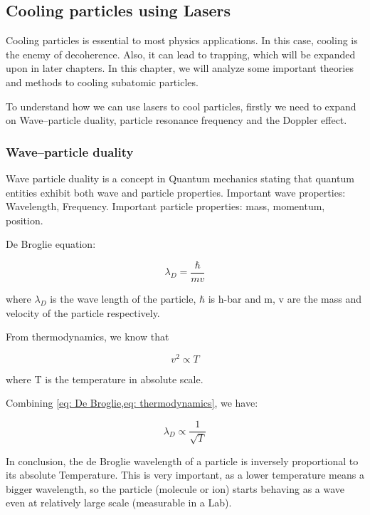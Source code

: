 \documentclass[../main.tex]{subfiles}
\begin{document}
\subsection{Cooling particles using Lasers}

\tab Cooling particles is essential to most physics applications. In this case, cooling is the enemy of decoherence. Also, it can lead to trapping, which will be expanded upon in later chapters. In this chapter, we will analyze some important theories and methods to cooling subatomic particles.
\par To understand how we can use lasers to cool particles, firstly we need to expand on Wave–particle duality, particle resonance frequency and the Doppler effect.

\subsubsection{Wave–particle duality}
\tab Wave particle duality is a concept in Quantum mechanics stating that quantum entities exhibit both wave and particle properties. Important wave properties: Wavelength, Frequency. Important particle properties: mass, momentum, position. 

De Broglie equation:

\begin{equation}
    \lambda_D = \frac{\hbar}{mv}
    \label{eq: De Broglie}
\end{equation}

where $\lambda_D$ is the wave length of the particle, $\hbar$ is h-bar and m, v are the mass and velocity of the particle respectively.

From thermodynamics, we know that

\begin{equation}
    v^2 \propto T
    \label{eq: thermodynamics}
\end{equation}

where T is the temperature in absolute scale.

Combining \cref{eq: De Broglie,eq: thermodynamics}, we have:

\begin{equation}
    \lambda_D \propto \frac{1}{\sqrt{T}}
\end{equation}

In conclusion, the de Broglie wavelength of a particle is inversely proportional to its absolute Temperature. This is very important, as a lower temperature means a bigger wavelength, so the particle (molecule or ion) starts behaving as a wave even at relatively large scale (measurable in a Lab).
\end{document}
